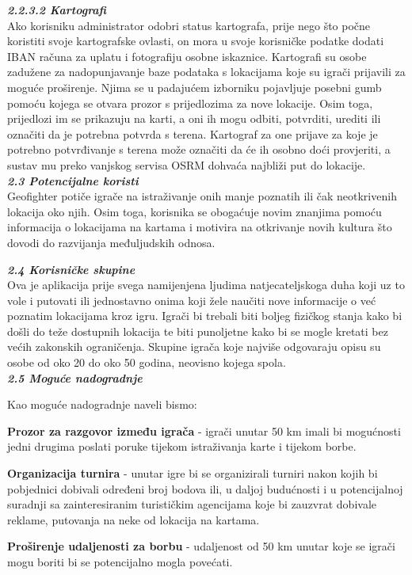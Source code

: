 		\textbf{\textit{\small2.2.3.2 Kartografi}}\\
		
		{Ako korisniku administrator odobri status kartografa, prije nego što počne koristiti svoje kartografske ovlasti, on mora u svoje korisničke podatke dodati IBAN računa za uplatu i fotografiju osobne iskaznice. Kartografi su osobe zadužene za nadopunjavanje baze podataka s lokacijama koje su igrači prijavili za moguće proširenje. Njima se u padajućem izborniku pojavljuje posebni gumb pomoću kojega se otvara prozor s prijedlozima za nove lokacije. Osim toga, prijedlozi im se prikazuju na karti, a oni ih mogu odbiti, potvrditi, urediti ili označiti da je potrebna potvrda s terena. Kartograf za one prijave za koje je potrebno potvrđivanje s terena može označiti da će ih osobno doći provjeriti, a sustav mu preko vanjskog servisa OSRM dohvaća najbliži put do lokacije.} \\
		
		\textbf{\textit{\large 2.3 Potencijalne koristi}}\\
		
		{Geofighter potiče igrače na istraživanje onih manje poznatih ili čak neotkrivenih lokacija oko njih. Osim toga, korisnika se obogaćuje novim znanjima pomoću informacija o lokacijama na kartama i motivira na otkrivanje novih kultura što dovodi do razvijanja međuljudskih odnosa.} \newpage
		
		\textbf{\textit{\large 2.4 Korisničke skupine}}\\
		
		{Ova je aplikacija prije svega namijenjena ljudima natjecateljskoga duha koji uz to vole i putovati ili jednostavno onima koji žele naučiti nove informacije o već poznatim lokacijama kroz igru. Igrači bi trebali biti boljeg fizičkog stanja kako bi došli do teže dostupnih lokacija te biti punoljetne kako bi se mogle kretati bez većih zakonskih ograničenja. Skupine igrača koje najviše odgovaraju opisu su osobe od oko 20 do oko 50 godina, neovisno kojega spola.}\\
		
		\textbf{\textit{\large 2.5 Moguće nadogradnje}}\\
		
		{Kao moguće nadogradnje naveli bismo:
		\begin{packed_item}
			\item {\textbf{Prozor za razgovor između igrača} - igrači unutar 50 km imali bi mogućnosti jedni drugima poslati poruke tijekom istraživanja karte i tijekom borbe.}\\
			\item {\textbf{Organizacija turnira} - unutar igre bi se organizirali turniri nakon kojih bi pobjednici dobivali određeni broj bodova ili, u daljoj budućnosti i u potencijalnoj suradnji sa zainteresiranim turističkim agencijama koje bi zauzvrat dobivale reklame, putovanja na neke od lokacija na kartama.}\\
			\item {\textbf{Proširenje udaljenosti za borbu} - udaljenost od 50 km unutar koje se igrači mogu boriti bi se potencijalno mogla povećati.} \\
	\end{packed_item} } 
		
